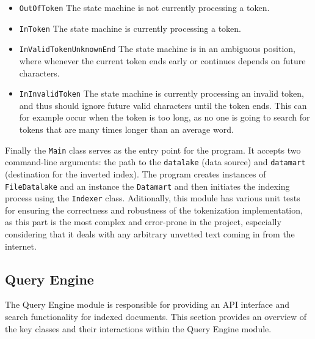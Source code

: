 \documentclass{article}
\begin{document}
\begin{itemize}
\begin{itemize}
	\item \texttt{OutOfToken} The state machine is not currently processing a token.
	\item \texttt{InToken} The state machine is currently processing a token.
	\item \texttt{InValidTokenUnknownEnd} The state machine is in an ambiguous position, where whenever the current token ends early or continues depends on future characters.
	\item \texttt{InInvalidToken} The state machine is currently processing an invalid token, and thus should ignore future valid characters until the token ends.
		This can for example occur when the token is too long, as no one is going to search for tokens that are many times longer than an average word.
\end{itemize}
\end{itemize}

Finally the \texttt{Main} class serves as the entry point for the program. It accepts two command-line arguments: the path to the \texttt{datalake} (data source) and \texttt{datamart} (destination for the inverted index).
The program creates instances of \texttt{FileDatalake} and an instance the \texttt{Datamart} and then initiates the indexing process using the \texttt{Indexer} class.
Aditionally, this module has various unit tests for ensuring the correctness and robustness of the tokenization implementation,
as this part is the most complex and error-prone in the project, especially considering that it deals with any arbitrary unvetted text coming in from the internet.

\subsection{Query Engine}

The Query Engine module is responsible for providing an API interface and search functionality for indexed documents. This section provides an overview of the key classes and their interactions within the Query Engine module.
\end{document}

